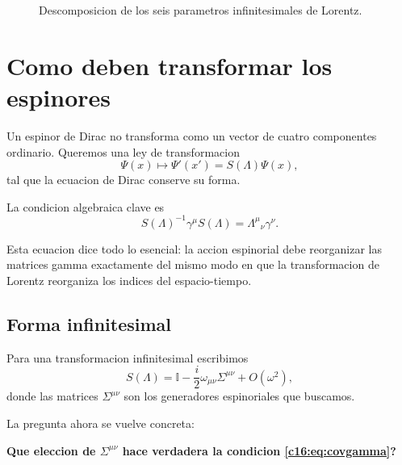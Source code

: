 \begin{figure}[h!]
\centering
{}
\caption{Descomposicion de los seis parametros infinitesimales de Lorentz.}
\end{figure}

\section{Como deben transformar los espinores}
Un espinor de Dirac no transforma como un vector de cuatro componentes ordinario. Queremos una ley de transformacion
\begin{equation}
\Psi(x)\mapsto \Psi'(x') = S(\Lambda)\Psi(x),
\end{equation}
tal que la ecuacion de Dirac conserve su forma.

La condicion algebraica clave es
\begin{equation}
S(\Lambda)^{-1}\gamma^\mu S(\Lambda)=\Lambda^\mu{}_\nu \gamma^\nu.
\label{c16:eq:covgamma}
\end{equation}

Esta ecuacion dice todo lo esencial: la accion espinorial debe reorganizar las matrices gamma exactamente del mismo modo en que la transformacion de Lorentz reorganiza los indices del espacio-tiempo.

\subsection{Forma infinitesimal}
Para una transformacion infinitesimal escribimos
\begin{equation}
S(\Lambda)=\mathbb{I}-\frac{i}{2}\omega_{\mu\nu}\Sigma^{\mu\nu}+O(\omega^2),
\label{c16:eq:sinf}
\end{equation}
donde las matrices $\Sigma^{\mu\nu}$ son los generadores espinoriales que buscamos.

La pregunta ahora se vuelve concreta:
\begin{displayquote}
\textbf{Que eleccion de $\Sigma^{\mu\nu}$ hace verdadera la condicion \eqref{c16:eq:covgamma}?}
\end{displayquote}


